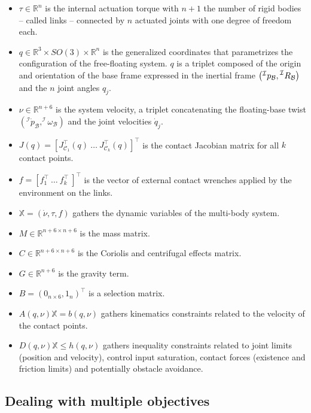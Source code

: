 \documentclass[12pt,a4paper,twoside]{article}
\begin{document}
\begin{itemize}
\item $\tau \in \mathbb{R}^n$ is the internal actuation torque with $n + 1$ the number of rigid bodies -- called links -- connected by $n$ actuated joints with one degree of freedom each.
\item ${q} \in \mathbb{R}^3 \times SO(3)\times \mathbb{R}^n$ is the generalized coordinates that parametrizes the configuration of the free-floating system. $q$ is a triplet composed of the origin and orientation of the base frame expressed in the inertial frame $\left(\prescript{\mathcal{I}}{}p_{\mathcal{B}},\prescript{\mathcal{I}}{}R_{\mathcal{B}}\right)$ and the $n$ joint angles $q_j$.
\item ${\nu} \in \mathbb{R}^{n+6}$ is the system velocity, a triplet concatenating the floating-base twist $\left (^\mathcal{I}\dot{ p}_{\mathcal{B}},^\mathcal{I}\omega_{\mathcal{B}}\right)$ and the joint velocities ${\dot{q}}_j$.
\item ${J}({q})= \left[{J}^\top _{\mathcal{C}_1}({q})~ \dots~ {J}^\top _{\mathcal{C}_k}({q}) \right]^\top$ is the contact Jacobian matrix for all $k$ contact points.
\item $f= \left[ {f}^\top_{1}~ \dots~ {f}^\top_{k}~ \right]^\top $ is the vector of external contact wrenches applied by the environment on the links.
\item $\mathbb{X} = \left(\dot{\nu}, \tau, f \right)$ gathers the dynamic variables of the multi-body system.
\item ${M} \in \mathbb{R}^{n+6 \times n+6}$ is the mass matrix.
\item ${C} \in \mathbb{R}^{n+6 \times n+6}$ is the Coriolis and centrifugal effects matrix.
\item ${G} \in \mathbb{R}^{n+6}$ is the gravity term.
\item $B = (0_{n\times 6} , 1_n)^\top$ is a selection matrix.
\item ${A}(q,\nu) \mathbb{X}   =  {b}(q,\nu)$ gathers kinematics constraints related to the velocity of the contact points.
\item ${D}(q,\nu) \mathbb{X} \leq {h}(q,\nu)$ gathers inequality constraints related to joint limits (position and velocity), control input saturation, contact forces (existence and friction limits) and potentially obstacle avoidance.
\end{itemize}

\subsection{Dealing with multiple objectives}
\end{document}
